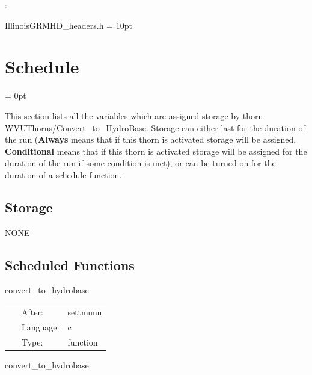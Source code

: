 \documentclass{article}
\begin{document}
\vspace{5mm}

: 

IllinoisGRMHD\_headers.h
\vspace{2mm}\parskip = 10pt 

\section{Schedule} 


\parskip = 0pt


\noindent This section lists all the variables which are assigned storage by thorn WVUThorns/Convert\_to\_HydroBase.  Storage can either last for the duration of the run ({\bf Always} means that if this thorn is activated storage will be assigned, {\bf Conditional} means that if this thorn is activated storage will be assigned for the duration of the run if some condition is met), or can be turned on for the duration of a schedule function.


\subsection*{Storage}NONE
\subsection*{Scheduled Functions}
\vspace{5mm}


\hspace{5mm} convert\_to\_hydrobase 

\hspace{5mm}{\it convert illinoisgrmhd-native variables to hydrobase } 


\hspace{5mm}

 \begin{tabular*}{160mm}{cll} 
~ & After:  & settmunu \\ 
~ & Language:  & c \\ 
~ & Type:  & function \\ 
\end{tabular*} 


\vspace{5mm}


\hspace{5mm} convert\_to\_hydrobase 
\end{document}
